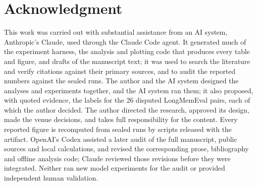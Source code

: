 \documentclass[conference]{IEEEtran}
\begin{document}
\section*{Acknowledgment}

This work was carried out with substantial assistance from an AI system,
Anthropic's Claude, used through the Claude Code agent. It generated much of the
experiment harness, the analysis and plotting code that produces every table and
figure, and drafts of the manuscript text; it was used to search the literature
and verify citations against their primary sources, and to audit the reported
numbers against the sealed runs. The author and the AI system designed the
analyses and experiments together, and the AI system ran them; it also
proposed, with quoted evidence, the labels for the 26 disputed LongMemEval
pairs, each of which the author decided. The author directed the research, approved its
design, made the venue decisions, and takes full responsibility for the content.
Every reported figure is recomputed from sealed runs by scripts released with
the artifact. OpenAI's Codex assisted a later audit of the full manuscript,
public sources and local calculations, and revised the corresponding prose,
bibliography and offline analysis code; Claude reviewed those revisions before
they were integrated. Neither ran new model experiments for the audit or
provided independent human validation.



\end{document}
